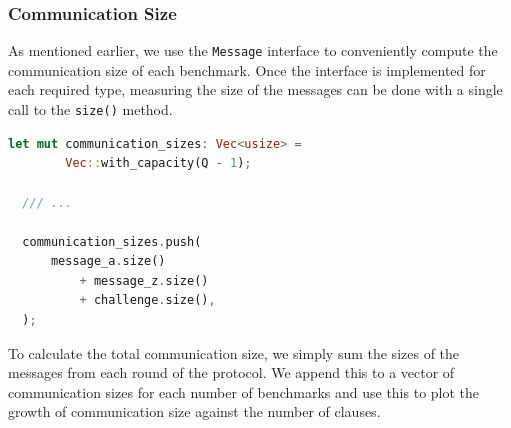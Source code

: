 \subsubsection{Communication Size} 
As mentioned earlier, we use the \texttt{Message} interface to conveniently 
compute the communication size of each benchmark. Once the interface is 
implemented for each required type, measuring the size of the messages 
can be done with a single call to the \texttt{size()} method. 

\begin{lstlisting}[language=rust]
  let mut communication_sizes: Vec<usize> =
        Vec::with_capacity(Q - 1);

  /// ...

  communication_sizes.push(
      message_a.size()
          + message_z.size()
          + challenge.size(),
  );
\end{lstlisting}

To calculate the total communication size, we simply sum the sizes of the 
messages from each round of the protocol. We append this to a vector of 
communication sizes for each number of benchmarks and use this to 
plot the growth of communication size against the number of clauses. 